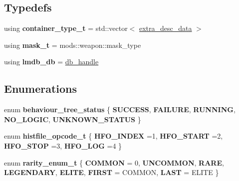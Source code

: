 \subsection*{Typedefs}
\begin{DoxyCompactItemize}
\item 
\mbox{\label{namespacemods_a00b664aad4148632b9bf6ae75edf5e6f}} 
using {\bfseries container\+\_\+type\+\_\+t} = std\+::vector$<$ \hyperlink{structmods_1_1extra__desc__data}{extra\+\_\+desc\+\_\+data} $>$
\item 
\mbox{\label{namespacemods_a7dae9576983aa2d6bc4f03fec7ceb9a8}} 
using {\bfseries mask\+\_\+t} = mods\+::weapon\+::mask\+\_\+type
\item 
\mbox{\label{namespacemods_a48ff20339fef03fd4f1bd17ce59ea469}} 
using {\bfseries lmdb\+\_\+db} = \hyperlink{structmods_1_1lmdb_1_1__db__handle}{db\+\_\+handle}
\end{DoxyCompactItemize}
\subsection*{Enumerations}
\begin{DoxyCompactItemize}
\item 
\mbox{\label{namespacemods_aedd8fe7f6b05c601c23a842577bfaf2d}} 
enum {\bfseries behaviour\+\_\+tree\+\_\+status} \{ \newline
{\bfseries S\+U\+C\+C\+E\+SS}, 
{\bfseries F\+A\+I\+L\+U\+RE}, 
{\bfseries R\+U\+N\+N\+I\+NG}, 
{\bfseries N\+O\+\_\+\+L\+O\+G\+IC}, 
\newline
{\bfseries U\+N\+K\+N\+O\+W\+N\+\_\+\+S\+T\+A\+T\+US}
 \}
\item 
\mbox{\label{namespacemods_a20f5dc4d7d0a79ea776dea59daffea20}} 
enum {\bfseries histfile\+\_\+opcode\+\_\+t} \{ {\bfseries H\+F\+O\+\_\+\+I\+N\+D\+EX} =1, 
{\bfseries H\+F\+O\+\_\+\+S\+T\+A\+RT} =2, 
{\bfseries H\+F\+O\+\_\+\+S\+T\+OP} =3, 
{\bfseries H\+F\+O\+\_\+\+L\+OG} =4
 \}
\item 
\mbox{\label{namespacemods_a2df2aa05ac0869b08ffefcb0455025f9}} 
enum {\bfseries rarity\+\_\+enum\+\_\+t} \{ \newline
{\bfseries C\+O\+M\+M\+ON} = 0, 
{\bfseries U\+N\+C\+O\+M\+M\+ON}, 
{\bfseries R\+A\+RE}, 
{\bfseries L\+E\+G\+E\+N\+D\+A\+RY}, 
\newline
{\bfseries E\+L\+I\+TE}, 
{\bfseries F\+I\+R\+ST} = C\+O\+M\+M\+ON, 
{\bfseries L\+A\+ST} = E\+L\+I\+TE
 \}
\end{DoxyCompactItemize}
